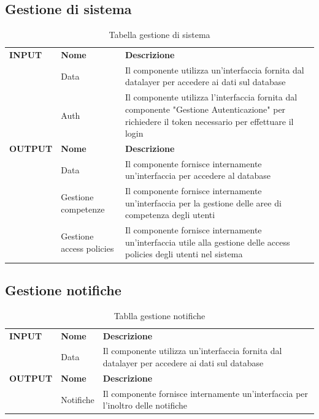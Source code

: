 \documentclass{article}
\begin{document}
\clearpage

\subsection{Gestione di sistema}

\begin{table}[htbp]
    \centering
    \renewcommand{\arraystretch}{1.5} %
    \begin{tabularx}{\textwidth}{| l | l | X |}
        \Xhline{2pt}
        \textbf{INPUT} & \textbf{Nome} & \textbf{Descrizione} \\
        \Xhline{2pt}
         & Data & Il componente utilizza un’interfaccia fornita dal datalayer per accedere ai dati sul database \\
        \hline
         & Auth & Il componente utilizza l'interfaccia fornita dal componente "Gestione Autenticazione" per richiedere il token necessario per effettuare il login \\
         \Xhline{2pt}
        \textbf{OUTPUT} & \textbf{Nome} & \textbf{Descrizione} \\
        \Xhline{2pt}
         & Data & Il componente fornisce internamente un’interfaccia per accedere al database \\
        \hline
         & Gestione competenze & Il componente fornisce internamente un'interfaccia per la gestione delle aree di competenza degli utenti \\
        \hline
         & Gestione access policies & Il componente fornisce internamente un'interfaccia utile alla gestione delle access policies degli utenti nel sistema \\
        \hline
        \end{tabularx}
    \caption{Tabella gestione di sistema}
\end{table}

\subsection{Gestione notifiche}

\begin{table}[htbp]
    \centering
    \renewcommand{\arraystretch}{1.5} %
    \begin{tabularx}{\textwidth}{| l | l | X |}
        \Xhline{2pt}
        \textbf{INPUT} & \textbf{Nome} & \textbf{Descrizione} \\
        \Xhline{2pt}
         & Data & Il componente utilizza un'interfaccia fornita dal datalayer per accedere ai dati sul database \\
        \Xhline{2pt}
        \textbf{OUTPUT} & \textbf{Nome} & \textbf{Descrizione} \\
        \Xhline{2pt}
         & Notifiche & Il componente fornisce internamente un'interfaccia per l'inoltro delle notifiche \\
        \hline
    \end{tabularx}
    \caption{Tablla gestione notifiche}
\end{table}
\end{document}
